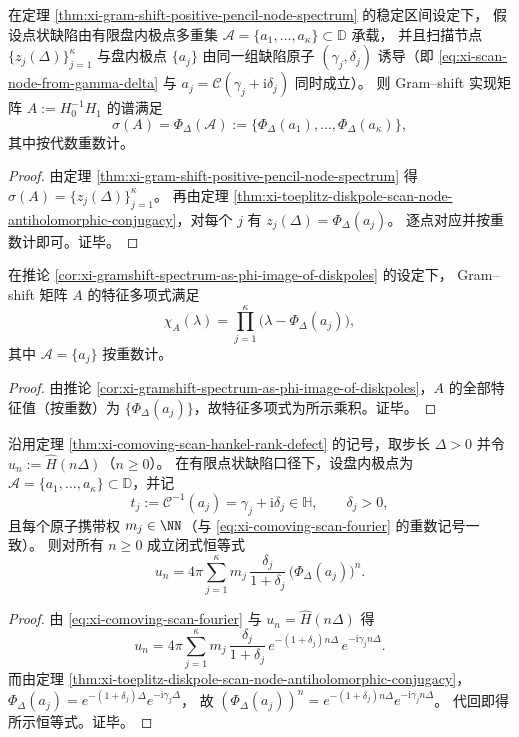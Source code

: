 \begin{corollary}\label{cor:xi-gramshift-spectrum-as-phi-image-of-diskpoles}
在定理 \ref{thm:xi-gram-shift-positive-pencil-node-spectrum} 的稳定区间设定下，
假设点状缺陷由有限盘内极点多重集 \(\mathcal A=\{a_1,\dots,a_\kappa\}\subset\mathbb{D}\) 承载，
并且扫描节点 \(\{z_j(\Delta)\}_{j=1}^{\kappa}\) 与盘内极点 \(\{a_j\}\) 由同一组缺陷原子 \((\gamma_j,\delta_j)\) 诱导（即 \eqref{eq:xi-scan-node-from-gamma-delta} 与 \(a_j=\mathcal{C}(\gamma_j+\mathrm{i}\delta_j)\) 同时成立）。
则 Gram--shift 实现矩阵 \(A:=H_0^{-1}H_1\) 的谱满足
\[
\sigma(A)=\Phi_\Delta(\mathcal A):=\{\Phi_\Delta(a_1),\dots,\Phi_\Delta(a_\kappa)\},
\]
其中按代数重数计。
\end{corollary}
\begin{proof}
由定理 \ref{thm:xi-gram-shift-positive-pencil-node-spectrum} 得 \(\sigma(A)=\{z_j(\Delta)\}_{j=1}^{\kappa}\)。
再由定理 \ref{thm:xi-toeplitz-diskpole-scan-node-antiholomorphic-conjugacy}，对每个 \(j\) 有 \(z_j(\Delta)=\Phi_\Delta(a_j)\)。
逐点对应并按重数计即可。证毕。
\end{proof}

\begin{proposition}\label{prop:xi-gramshift-charpoly-as-phi-image-of-diskpoles}
在推论 \ref{cor:xi-gramshift-spectrum-as-phi-image-of-diskpoles} 的设定下，
Gram--shift 矩阵 \(A\) 的特征多项式满足
\[
\chi_A(\lambda)=\prod_{j=1}^{\kappa}\bigl(\lambda-\Phi_\Delta(a_j)\bigr),
\]
其中 \(\mathcal A=\{a_j\}\) 按重数计。
\end{proposition}
\begin{proof}
由推论 \ref{cor:xi-gramshift-spectrum-as-phi-image-of-diskpoles}，\(A\) 的全部特征值（按重数）为 \(\{\Phi_\Delta(a_j)\}\)，故特征多项式为所示乘积。证毕。
\end{proof}

\begin{proposition}[扫描谱指纹的盘几何反全纯表达]\label{prop:xi-scan-fingerprint-antiholomorphic-functional-of-diskpoles}
沿用定理 \ref{thm:xi-comoving-scan-hankel-rank-defect} 的记号，取步长 \(\Delta>0\) 并令 \(u_n:=\widehat H(n\Delta)\)（\(n\ge 0\)）。
在有限点状缺陷口径下，设盘内极点为 \(\mathcal A=\{a_1,\dots,a_\kappa\}\subset\mathbb{D}\)，并记
\[
t_j:=\mathcal{C}^{-1}(a_j)=\gamma_j+\mathrm{i}\delta_j\in\mathbb{H},
\qquad
\delta_j>0,
\]
且每个原子携带权 \(m_j\in\NN\)（与 \eqref{eq:xi-comoving-scan-fourier} 的重数记号一致）。
则对所有 \(n\ge 0\) 成立闭式恒等式
\[
u_n
=4\pi\sum_{j=1}^{\kappa}m_j\,\frac{\delta_j}{1+\delta_j}\,\bigl(\Phi_\Delta(a_j)\bigr)^{n}.
\]
\end{proposition}
\begin{proof}
由 \eqref{eq:xi-comoving-scan-fourier} 与 \(u_n=\widehat H(n\Delta)\) 得
\[
u_n
=4\pi\sum_{j=1}^{\kappa}m_j\,\frac{\delta_j}{1+\delta_j}\,e^{-(1+\delta_j)n\Delta}\,e^{-\mathrm{i}\gamma_j n\Delta}.
\]
而由定理 \ref{thm:xi-toeplitz-diskpole-scan-node-antiholomorphic-conjugacy}，
\(
\Phi_\Delta(a_j)=e^{-(1+\delta_j)\Delta}e^{-\mathrm{i}\gamma_j\Delta}
\)，
故 \((\Phi_\Delta(a_j))^{n}=e^{-(1+\delta_j)n\Delta}e^{-\mathrm{i}\gamma_j n\Delta}\)。
代回即得所示恒等式。证毕。
\end{proof}

